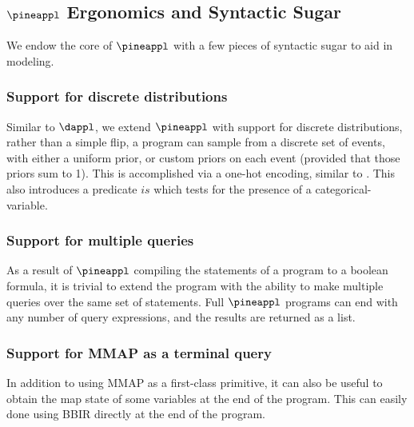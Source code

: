 \subsection{$\pineappl$ Ergonomics and Syntactic Sugar}
\label{appendix:pineappl-sugar}

We endow the core of $\pineappl$ with a few pieces of syntactic sugar to aid in
modeling.

\subsubsection{Support for discrete distributions} 
Similar to $\dappl$, we extend $\pineappl$ with support for discrete
distributions, rather than a simple flip, a program can sample from a discrete
set of events, with either a uniform prior, or custom priors on each event
(provided that those priors sum to 1). This is accomplished via a one-hot
encoding, similar to \citep{holtzen2020scaling}. This also introduces a
predicate $is$ which tests for the presence of a categorical-variable.  

\subsubsection{Support for multiple queries} 
As a result of $\pineappl$ compiling the statements of a program to a boolean
formula, it is trivial to extend the program with the ability to make multiple
queries over the same set of statements. Full $\pineappl$ programs can end with 
any number of query expressions, and the results are returned as a list. 

\subsubsection{Support for MMAP as a terminal query}
In addition to using MMAP as a first-class primitive, it can also be useful to 
obtain the map state of some variables at the end of the program. This can easily
done using BBIR directly at the end of the program.

